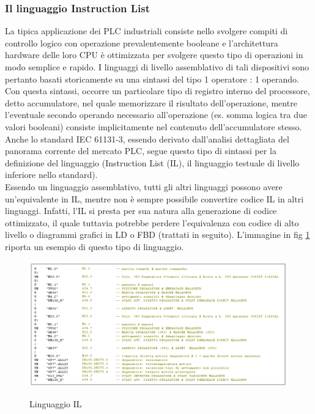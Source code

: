\documentclass[12pt, a4paper, oneside]{book}
\begin{document}
\subsubsection{Il linguaggio Instruction List}
La tipica applicazione dei PLC industriali consiste nello svolgere compiti di controllo logico con operazione prevalentemente booleane e l'architettura hardware delle loro CPU è ottimizzata per svolgere questo tipo di operazioni in modo semplice e rapido. I linguaggi di livello assemblativo di tali dispositivi sono pertanto basati storicamente su una sintassi del tipo 1 operatore : 1 operando. Con questa sintassi, occorre un particolare tipo di registro interno del processore, detto accumulatore, nel quale memorizzare il risultato dell'operazione, mentre l'eventuale secondo operando necessario all'operazione (es. somma logica tra due valori booleani) consiste implicitamente nel contenuto dell'accumulatore stesso. Anche lo standard IEC 61131-3, essendo derivato dall'analisi dettagliata del panorama corrente del mercato PLC, segue questo tipo di sintassi per la definizione del linguaggio (Instruction List (IL), il linguaggio testuale di livello inferiore nello standard).
\\Essendo un linguaggio assemblativo, tutti gli altri linguaggi possono avere un'equivalente in IL, mentre non è sempre possibile convertire codice IL in altri linguaggi. Infatti, l'IL si presta per sua natura alla generazione di codice ottimizzato, il quale tuttavia potrebbe perdere l'equivalenza con codice di alto livello o diagrammi grafici in LD o FBD (trattati in seguito). 
L'immagine in fig \ref{IL} riporta un esempio di questo tipo di linguaggio.

	\begin{figure}[H]
	\centering
	\includegraphics[width=12cm]{Immagini/IL}
	\label{IL}
	\caption{Linguaggio IL}
\end{figure}
\end{document}
